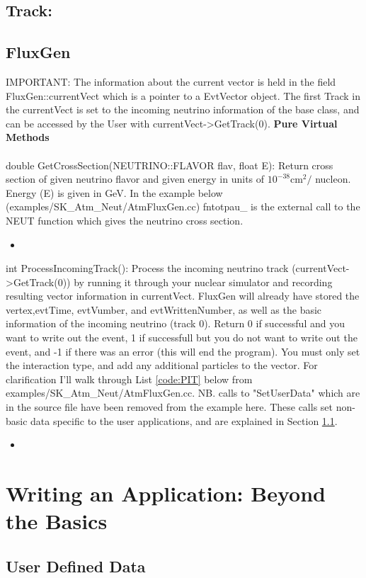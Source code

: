\documentclass[12pt]{article}
\newcommand{\insertcode}[4]{\begin{itemize}\item[]\end{itemize}} %
\begin{document}
\subsection{Track:}
 
  


\subsection{FluxGen}
\label{sec:FG}	
IMPORTANT:  The information about the current vector is held in the field FluxGen::currentVect which is a pointer to a EvtVector object.  The first Track in the currentVect is set to the incoming neutrino information of the base class, and can be accessed by the User with currentVect-\textgreater GetTrack(0).
\textbf{Pure Virtual Methods}\\
\\
double GetCrossSection(NEUTRINO::FLAVOR flav, float E):   Return cross section of given neutrino flavor and given energy in units of $10^{-38} \textrm{cm}^2 / $ nucleon.  Energy (E) is given in GeV.   In the example below (examples/SK\_Atm\_Neut/AtmFluxGen.cc) fntotpau\_ 
is the external call to the NEUT function which gives the neutrino cross section.

\insertcode{../examples/SK_Atm_Neut/AtmFluxGen.cc}{AtmFluxGen::GetCrossSection}{82-92}{code:GXS}



int ProcessIncomingTrack():  Process the incoming neutrino track (currentVect->GetTrack(0)) by running it through your nuclear simulator and recording resulting vector information in currentVect.  FluxGen will already have stored the vertex,evtTime, evtVumber, and evtWrittenNumber, as well as the basic information of the incoming neutrino (track 0).   Return 0 if successful and you want to write out the event, 1 if successfull but you do not want to write out the event, and -1 if there was an error (this will end the program). You must only set the interaction type, and add any additional particles to the vector.  For clarification I'll walk through List \ref{code:PIT} below from examples/SK\_Atm\_Neut/AtmFluxGen.cc.  NB. calls to "SetUserData" which are in the source file have been removed from the example here.  These calls set non-basic data specific to the user applications, and are explained in Section \ref{sec:userdata}.

\insertcode{../examples/SK_Atm_Neut/AtmFluxGen.cc}{AtmFluxGen::ProcessIncomingTrack}{{93-122,135-140,155-176}}{code:PIT}
 




\section{Writing an Application: Beyond the Basics}

\subsection{User Defined Data}
\label{sec:userdata}
\end{document}

